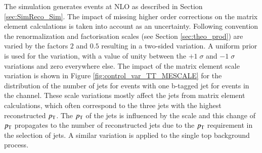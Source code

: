 The \POWHEG simulation generates \ttbar events at NLO as described in Section \ref{sec:SimReco_Sim}.
The impact of missing higher order corrections on the matrix element calculations is taken into account as an uncertainty.
Following convention the renormalization and factorisation scales (see Section \ref{sec:theo_prod}) are varied by the factors $2$ and $0.5$ resulting in a two-sided variation.
A uniform prior is used for the variation, with a value of unity between the $+1 \; \sigma$ and $-1 \; \sigma$ variations and zero everywhere else.
The impact of the matrix element scale variation is shown in Figure \ref{fig:control_var_TT_MESCALE} for the distribution of the number of jets for events with one b-tagged jet for events in the \emu channel.
These scale variations mostly affect the jets from matrix element calculations, which often correspond to the three jets with the highest reconstructed $p_{\mathrm{T}}$.
The $p_{\mathrm{T}}$ of the jets is influenced by the scale and this change of $p_{\mathrm{T}}$ propagates to the number of reconstructed jets due to the $p_{\mathrm{T}}$ requirement in the selection of jets.
A similar variation is applied to the single top background process.


